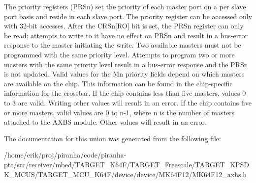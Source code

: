 The priority registers (P\+R\+Sn) set the priority of each master port on a per slave port basis and reside in each slave port. The priority register can be accessed only with 32-\/bit accesses. After the C\+R\+Sn\mbox{[}RO\mbox{]} bit is set, the P\+R\+Sn register can only be read; attempts to write to it have no effect on P\+R\+Sn and result in a bus-\/error response to the master initiating the write. Two available masters must not be programmed with the same priority level. Attempts to program two or more masters with the same priority level result in a bus-\/error response and the P\+R\+Sn is not updated. Valid values for the Mn priority fields depend on which masters are available on the chip. This information can be found in the chip-\/specific information for the crossbar. If the chip contains less than five masters, values 0 to 3 are valid. Writing other values will result in an error. If the chip contains five or more masters, valid values are 0 to n-\/1, where n is the number of masters attached to the A\+X\+BS module. Other values will result in an error. 

The documentation for this union was generated from the following file\+:\begin{DoxyCompactItemize}
\item 
/home/erik/proj/piranha/code/piranha-\/ptc/src/receiver/mbed/\+T\+A\+R\+G\+E\+T\+\_\+\+K64\+F/\+T\+A\+R\+G\+E\+T\+\_\+\+Freescale/\+T\+A\+R\+G\+E\+T\+\_\+\+K\+P\+S\+D\+K\+\_\+\+M\+C\+U\+S/\+T\+A\+R\+G\+E\+T\+\_\+\+M\+C\+U\+\_\+\+K64\+F/device/device/\+M\+K64\+F12/M\+K64\+F12\+\_\+axbs.\+h\end{DoxyCompactItemize}
